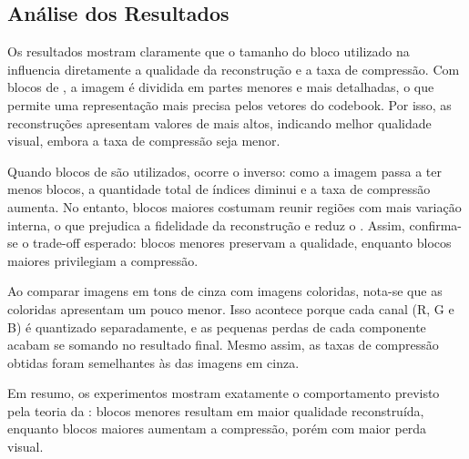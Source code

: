 \documentclass[../main.tex]{subfiles}
\begin{document}
\subsection{Análise dos Resultados}
Os resultados mostram claramente que o tamanho do bloco utilizado na \vq{} influencia diretamente a qualidade da reconstrução e a taxa de compressão. Com blocos de , a imagem é dividida em partes menores e mais detalhadas, o que permite uma representação mais precisa pelos vetores do codebook. Por isso, as reconstruções apresentam valores de \psnr{} mais altos, indicando melhor qualidade visual, embora a taxa de compressão seja menor.

Quando blocos de  são utilizados, ocorre o inverso: como a imagem passa a ter menos blocos, a quantidade total de índices diminui e a taxa de compressão aumenta. No entanto, blocos maiores costumam reunir regiões com mais variação interna, o que prejudica a fidelidade da reconstrução e reduz o \psnr{}. Assim, confirma-se o trade-off esperado: blocos menores preservam a qualidade, enquanto blocos maiores privilegiam a compressão.

Ao comparar imagens em tons de cinza com imagens coloridas, nota-se que as coloridas apresentam \psnr{} um pouco menor. Isso acontece porque cada canal (R, G e B) é quantizado separadamente, e as pequenas perdas de cada componente acabam se somando no resultado final. Mesmo assim, as taxas de compressão obtidas foram semelhantes às das imagens em cinza.

Em resumo, os experimentos mostram exatamente o comportamento previsto pela teoria da \vq{}: blocos menores resultam em maior qualidade reconstruída, enquanto blocos maiores aumentam a compressão, porém com maior perda visual.
\end{document}
